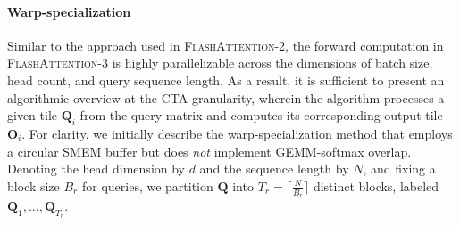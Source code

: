 \begin{enumerate}
\paragraph{Warp-specialization}
Similar to the approach used in \textsc{FlashAttention-2}, the forward computation in \textsc{FlashAttention-3} is highly parallelizable across the dimensions of batch size, head count, and query sequence length. As a result, it is sufficient to present an algorithmic overview at the CTA granularity, wherein the algorithm processes a given tile $\mathbf{Q}_i$ from the query matrix and computes its corresponding output tile $\mathbf{O}_i$. For clarity, we initially describe the warp-specialization method that employs a circular SMEM buffer but does \emph{not} implement GEMM-softmax overlap. Denoting the head dimension by $d$ and the sequence length by $N$, and fixing a block size $B_r$ for queries, we partition $\mathbf{Q}$ into $T_r = \lceil \frac{N}{B_r} \rceil$ distinct blocks, labeled $\mathbf{Q}_1, \ldots, \mathbf{Q}_{T_r}$.


\end{enumerate}
